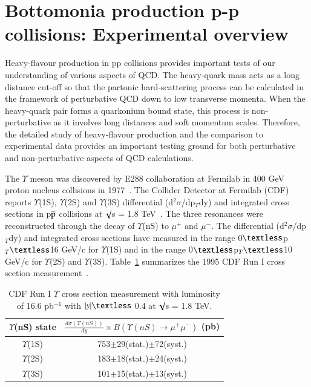 
\section{Bottomonia production p-p collisions: Experimental overview}


Heavy-flavour production in pp collisions provides important tests of our understanding of various aspects of QCD.
The heavy-quark mass acts as a long distance cut-off so that the partonic hard-scattering process can be calculated
in the framework of perturbative QCD down to low transverse momenta. When the heavy-quark pair forms a quarkonium bound
state, this process is non-perturbative as it involves long distances and soft momentum scales. Therefore, the detailed
study of heavy-flavour production and the comparison to experimental data provides an important testing ground for
both perturbative and non-perturbative aspects of QCD calculations.


The $\Upsilon$ meson was discovered by E288 collaboration at Fermilab in 400 GeV proton nucleus
collisions in 1977~\cite{PhysRevLett.39.252}.
The Collider Detector at Fermilab (CDF) reports $\Upsilon$(1S), $\Upsilon$(2S) and $\Upsilon$(3S) 
differential (d$^{2}\sigma$/dp$_{T}$dy) and integrated cross sections in p$\overline{\rm p}$ collisions at
$\surd$s = 1.8 TeV~\cite{CDF:1995gwi}. The three resonances were reconstructed through the decay of
$\Upsilon$(nS) to $\mu^{+}$ and $\mu^{-}$. The differential (d$^{2}\sigma$/dp$_{T}$dy) and integrated
cross sections have measured in the range 0$\textless$p$_{T}\textless$16 GeV/c for $\Upsilon$(1S) and in the range
0$\textless$p$_{T}\textless$10 GeV/c for $\Upsilon$(2S) and $\Upsilon$(3S). Table~\ref{Tab:YCrossCDF95} summarizes
the 1995 CDF Run I cross section measurement~\cite{CDF:1995gwi}.    

\begin{table}
  \begin{center}
    \caption[]{CDF Run I $\Upsilon$ cross section measurement with luminosity of 16.6 pb$^{-1}$ with $|y|\textless$ 0.4 at
    $\surd$s = 1.8 TeV.}
\label{Tab:YCrossCDF95}
\begin{tabular}{cc} 
\hline 
\hline
$\Upsilon$(nS) state             &$\frac{d\sigma(\Upsilon(nS))}{dy}\times B(\Upsilon(nS)\rightarrow\mu^{+}\mu^{-})$ (pb)    \\              
\hline
$\Upsilon$(1S)                   &753$\pm$29(stat.)$\pm$72(syst.)\\
$\Upsilon$(2S)                   &183$\pm$18(stat.)$\pm$24(syst.)\\
$\Upsilon$(3S)                   &101$\pm$15(stat.)$\pm$13(syst.)\\   
\hline
\hline
\end{tabular}
\end{center}
\end{table}

